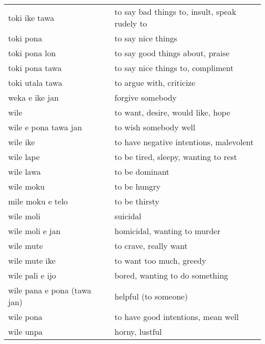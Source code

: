 \begin{supertabular}{p{4,5cm}|ll}
    toki ike tawa               &  & to say bad things to, insult, speak rudely to                      \\
    toki pona                   &  & to say nice things                                                 \\
    toki pona lon               &  & to say good things about, praise                                   \\
    toki pona tawa              &  & to say nice things to, compliment                                  \\
    toki utala tawa             &  & to argue with, criticize                                           \\
    weka e ike jan              &  & forgive somebody                                                   \\
    wile                        &  & to want, desire, would like, hope                                  \\
    wile e pona tawa jan        &  & to wish somebody well                                              \\
    wile ike                    &  & to have negative intentions, malevolent                            \\
    wile lape                   &  & to be tired, sleepy, wanting to rest                               \\
    wile lawa                   &  & to be dominant                                                     \\
    wile moku                   &  & to be hungry                                                       \\
    mile moku e telo            &  & to be thirsty                                                      \\
    wile moli                   &  & suicidal                                                           \\
    wile moli e jan             &  & homicidal, wanting to murder                                       \\
    wile mute                   &  & to crave, really want                                              \\
    wile mute ike               &  & to want too much, greedy                                           \\
    wile pali e ijo             &  & bored, wanting to do something                                     \\
    wile pana e pona (tawa jan) &  & helpful (to someone)                                               \\
    wile pona                   &  & to have good intentions, mean well                                 \\
    wile unpa                   &  & horny, lustful                                                     \\
\end{supertabular} \\
%
%
